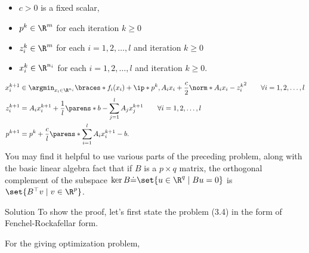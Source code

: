 \documentclass{article}
\theoremstyle{plain}
\theoremstyle{definition}
\theoremstyle{remark}
\begin{document}
\begin{problem}
\begin{enumerate}[(a)]
        \begin{itemize}
            \item $c>0$ is a fixed scalar,
            \item $p^k\in\R^m$ for each iteration $k\geq 0$
            \item $z_i^k\in\R^m$ for each $i=1,2,\ldots,l$ and iteration $k\geq 0$
            \item $x_i^k\in\R^{n_i}$ for each $i=1,2,\ldots,l$ and iteration $k\geq 0$.
        \end{itemize}
        \begin{align*}
            x_i^{k+1} &\in \argmin_{x_i\in\R^{n_i}}\braces*{f_i(x_i)+\ip*{p^k,A_ix_i}+\frac{c}{2}\norm*{A_ix_i-z_i^k}^2} \qquad \forall i=1,2,\ldots,l\\
            z_i^{k+1} &= A_ix_i^{k+1}+\frac{1}{l}\parens*{b-\sum_{j=1}^lA_jx_j^{k+1}} \qquad \forall i=1,2,\ldots,l \\
            p^{k+1} &= p^k+\frac{c}{l}\parens*{\sum_{i=1}^lA_ix_i^{k+1}-b}.
        \end{align*}
        You may find it helpful to use various parts of the preceding problem, along with the basic linear algebra fact that if $B$ is a $p\times q$ matrix, the orthogonal complement of the subspace $\ker B \dot{=}\set{u\in\R^q\mid Bu=0}$ is $\set{B^{\top}v\mid v\in\R^p}$.
    \end{enumerate}
\end{problem}

\begin{solution}
    {Solution}
    To show the proof, let's first state the problem (3.4) in the form of Fenchel-Rockafellar form.

    For the giving optimization problem, 
    
\end{solution}
\end{document}
